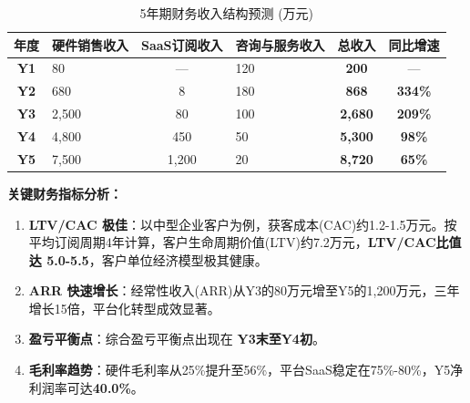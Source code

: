 \begin{table}[htbp]
	\centering
	\caption{5年期财务收入结构预测 (万元)}
	\label{tab:financial_forecast_5y}
	\renewcommand{\arraystretch}{1.4}
	\begin{tabular}{cp{2.5cm}cp{3cm}cc}
		\toprule
		\textbf{年度} & \textbf{硬件销售收入} & \textbf{SaaS订阅收入} & \textbf{咨询与服务收入} & \textbf{总收入} & \textbf{同比增速} \\
		\midrule
		\textbf{Y1} & 80 & — & 120 & \textbf{200} & — \\
		\textbf{Y2} & 680 & 8 & 180 & \textbf{868} & \textbf{334\%} \\
		\textbf{Y3} & 2,500 & 80 & 100 & \textbf{2,680} & \textbf{209\%} \\
		\textbf{Y4} & 4,800 & 450 & 50 & \textbf{5,300} & \textbf{98\%} \\
		\textbf{Y5} & 7,500 & 1,200 & 20 & \textbf{8,720} & \textbf{65\%} \\
		\bottomrule
	\end{tabular}
\end{table}

\textbf{关键财务指标分析：}
\begin{enumerate}
	\item \textbf{LTV/CAC 极佳}：以中型企业客户为例，获客成本(CAC)约1.2-1.5万元。按平均订阅周期4年计算，客户生命周期价值(LTV)约7.2万元，\textbf{LTV/CAC比值达 5.0-5.5}，客户单位经济模型极其健康。
	\item \textbf{ARR 快速增长}：经常性收入(ARR)从Y3的80万元增至Y5的1,200万元，三年增长15倍，平台化转型成效显著。
	\item \textbf{盈亏平衡点}：综合盈亏平衡点出现在 \textbf{Y3末至Y4初}。
	\item \textbf{毛利率趋势}：硬件毛利率从25\%提升至56\%，平台SaaS稳定在75\%-80\%，Y5净利润率可达\textbf{40.0\%}。
\end{enumerate}